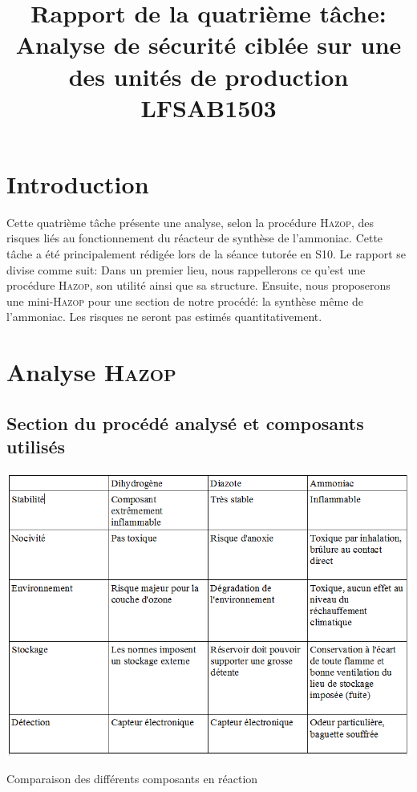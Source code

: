 
\title{\vspace{\fill}\begin{LARGE} \begin{bf}
Rapport de la quatrième tâche: Analyse de sécurité ciblée sur une des unités de production\\
LFSAB1503 \\
\end{bf}\end{LARGE}
\vspace{\fill}}

\maketitle
\newpage
\tableofcontents
\newpage
\newpage
\section{Introduction}

	Cette quatrième tâche présente une analyse, selon la procédure \textsc{Hazop}, des risques liés au fonctionnement 
du réacteur de synthèse de l’ammoniac. Cette tâche a été principalement rédigée lors de la séance tutorée en S10. Le rapport 
se divise comme suit: Dans un premier lieu, nous rappellerons ce qu'est une procédure \textsc{Hazop}, son utilité ainsi 
que sa structure. Ensuite, nous proposerons une mini-\textsc{Hazop} pour une section de notre procédé: la synthèse même 
de l'ammoniac. Les risques ne seront pas estimés quantitativement.

\section{Analyse \textsc{Hazop}}

\subsection{Section du procédé analysé et composants utilisés}
\begin{table}[ht!]
 \centering
 \includegraphics[scale=0.6]{TabComp.PNG}
 \caption{Comparaison des différents composants en réaction}
 \label{TabComp}
\end{table}

